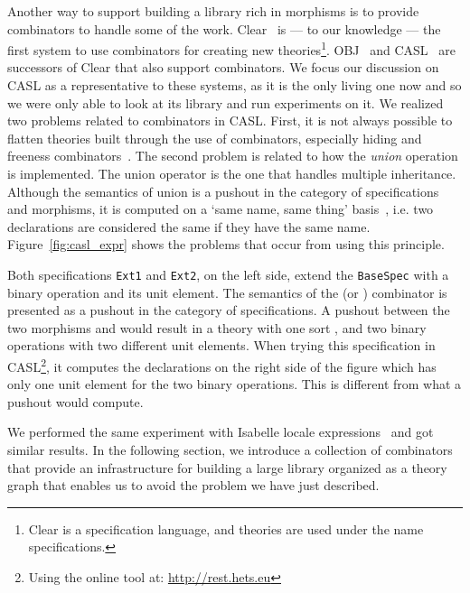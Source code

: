 Another way to support building a library rich in morphisms is to provide combinators to handle some of the work. Clear~\cite{Goguen1980} is --- to our knowledge --- the first system to use combinators for creating new theories\footnote{Clear is a specification language, and theories are used under the name specifications.}. OBJ~\cite{Obj2000Goguen} and CASL~\cite{CoFI:2004:CASL-RM} are successors of Clear that also support combinators. We focus our discussion on CASL as a representative to these systems, as it is the only living one now and so we were only able to look at its library and run experiments on it. 
We realized two problems related to combinators in CASL. First, it is not always possible to flatten theories built through the use of combinators, especially hiding and freeness combinators~\cite{CoFI:2004:CASL-RM}. The second problem is related to how the \emph{union} operation is implemented. The union operator is the one that handles multiple inheritance. Although the semantics of union is a pushout in the category of specifications and morphisms, it is computed on a `same name, same thing' basis~\cite{bidoit2003casl}, i.e. two declarations are considered the same if they have the same name. Figure~\ref{fig:casl_expr} shows the problems that occur from using this principle. 
\begin{figure}

\end{figure}
Both specifications \verb|Ext1| and \verb|Ext2|, on the left side, extend the \verb|BaseSpec| with a binary operation and its unit element. The semantics of the  (or ) combinator is presented as a pushout in the category of specifications. A pushout between the two morphisms  and  would result in a theory with one sort , and  two binary operations with two different unit elements. When trying this specification in CASL\footnote{Using the online tool at: \url{http://rest.hets.eu}}, it computes the declarations on the right side of the figure which has only one unit element for the two binary operations. This is different from what a pushout would compute. 

We performed the same experiment with Isabelle locale expressions~\cite{ballarin2003locales} and got similar results. In the following section, we introduce a collection of combinators that provide an infrastructure for building a large library organized as a theory graph that enables us to avoid the problem we have just described. 

